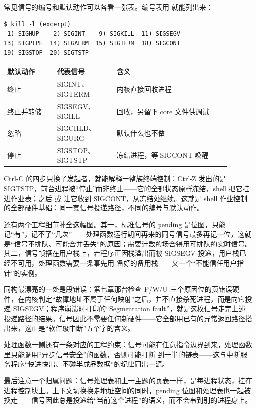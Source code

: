 常见信号的编号和默认动作可以各看一张表。编号表用  就能列出来：

\begin{lstlisting}
$ kill -l (excerpt)
 1) SIGHUP    2) SIGINT    9) SIGKILL  11) SIGSEGV
13) SIGPIPE  14) SIGALRM  15) SIGTERM  18) SIGCONT
19) SIGSTOP  20) SIGTSTP
\end{lstlisting}

\begin{longtable}{L{0.20\linewidth}L{0.24\linewidth}L{0.46\linewidth}}
\toprule
默认动作 & 代表信号 & 含义 \\
\midrule
终止 & SIGINT、SIGTERM & 内核直接回收进程 \\
终止并转储 & SIGSEGV、SIGILL & 回收，另留下 core 文件供调试 \\
忽略 & SIGCHLD、SIGURG & 默认什么也不做 \\
停止 & SIGSTOP、SIGTSTP & 冻结进程，等 SIGCONT 唤醒 \\
\bottomrule
\end{longtable}

Ctrl-C 的四步只换了发起者，就能解释一整族终端控制：Ctrl-Z 发出的是 SIGTSTP，前台进程被“停止”而非终止——它的全部状态原样冻结，shell 把它挂进作业表；之后  或  让它收到 SIGCONT，从冻结处继续。这就是 shell 作业控制的全部硬件基础：同一套信号投递路径，不同的编号与默认动作。

还有两个工程细节补全这幅图。其一，标准信号的 pending 是位图，只能记“有”，记不了“几次”——处理函数运行期间再来的同号信号最多再记一位，这就是“信号不排队、可能合并丢失”的原因；需要计数的场合得用可排队的实时信号。其二，信号帧搭在用户栈上，若程序正因栈溢出而被 SIGSEGV 投递，用户栈已经不可用，处理函数需要一条事先用  备好的备用栈——又一个“不能信任用户指针”的实例。

同构最漂亮的一处是段错误：第七章那台检查 P/W/U 三个原因位的页错误硬件，在内核判定“故障地址不属于任何映射”之后，并不直接杀死进程，而是向它投递 SIGSEGV；程序崩溃时打印的“Segmentation fault”，就是这枚信号走完上述投递路径的结果。信号因此不需要任何新硬件——它全部用已有的异常返回路径搭出来，这正是“软件级中断”五个字的含义。

处理函数一侧还有一条对应的工程约束：信号可能在任意指令边界到来，处理函数里只能调用“异步信号安全”的函数，否则可能打断  到一半的链表——这与中断服务程序“快进快出、不碰半成品数据”的纪律同出一源。

最后注意一个归属问题：信号处理表和上一主题的页表一样，是每进程状态，挂在进程控制块上。上下文切换换走地址空间的同时，pending 位图和处理表也一起被换走——信号因此总是投递给“当前这个进程”的语义，而不会串到别的进程身上。

